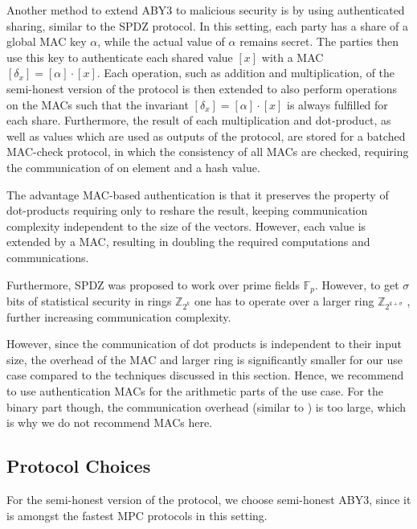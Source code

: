 \documentclass[a4paper,11pt,
]{article}
\newcommand{\F}{\ensuremath{\mathbb{F}}\xspace}
\newcommand{\Z}{\ensuremath{\mathbb{Z}}\xspace}
\newcommand{\shared}[1]{\ensuremath{[{#1}]}}
\begin{document}
Another method to extend ABY3 to malicious security is by using authenticated sharing, similar to the SPDZ \cite{DBLP:conf/crypto/DamgardPSZ12} protocol. In this setting, each party has a share of a global MAC key $\alpha$, while the actual value of $\alpha$ remains secret. The parties then use this key to authenticate each shared value $\shared{x}$ with a MAC $\shared{\delta_x} = \shared{\alpha} \cdot \shared{x}$. Each operation, such as addition and multiplication, of the semi-honest version of the protocol is then extended to also perform operations on the MACs such that the invariant $\shared{\delta_x} = \shared{\alpha} \cdot \shared{x}$ is always fulfilled for each share. Furthermore, the result of each multiplication and dot-product, as well as values which are used as outputs of the protocol, are stored for a batched MAC-check protocol, in which the consistency of all MACs are checked, requiring the communication of on element and a hash value.

The advantage MAC-based authentication is that it preserves the property of dot-products requiring only to reshare the result, keeping communication complexity independent to the size of the vectors. However, each value is extended by a MAC, resulting in doubling the required computations and communications.

Furthermore, SPDZ was proposed to work over prime fields $\F_p$. However, to get $\sigma$ bits of statistical security in rings $\Z_{2^k}$ one has to operate over a larger ring $\Z_{2^{k+\sigma}}$ \cite{DBLP:conf/acns/AbspoelD0N21, DBLP:conf/uss/Dalskov0K21}, further increasing communication complexity.

However, since the communication of dot products is independent to their input size, the overhead of the MAC and larger ring is significantly smaller for our use case compared to the techniques discussed in this section. Hence, we recommend to use authentication MACs for the arithmetic parts of the use case. For the binary part though, the communication overhead (similar to ) is too large, which is why we do not recommend MACs here.


\subsection{Protocol Choices}

For the semi-honest version of the protocol, we choose semi-honest ABY3, since it is amongst the fastest MPC protocols in this setting.
\end{document}
